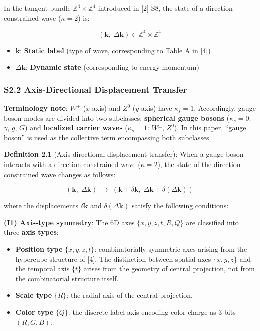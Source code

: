 \documentclass[
  a4paper,11pt]{article}
\providecommand{\tightlist}{%
  \setlength{\itemsep}{0pt}\setlength{\parskip}{0pt}}
\theoremstyle{definition}
\theoremstyle{remark}
\begin{document}
In the tangent bundle \(\mathbb{Z}^4 \times \mathbb{Z}^4\) introduced in
{[}2{]} S8, the state of a direction-constrained wave (\(\kappa = 2\))
is:

\[(\mathbf{k},\; \Delta\mathbf{k}) \in \mathbb{Z}^4 \times \mathbb{Z}^4\]

\begin{itemize}
\tightlist
\item
  \(\mathbf{k}\): \textbf{Static label} (type of wave, corresponding to
  Table A in {[}4{]})
\item
  \(\Delta\mathbf{k}\): \textbf{Dynamic state} (corresponding to
  energy-momentum)
\end{itemize}

\subsubsection{S2.2 Axis-Directional Displacement
Transfer}\label{s2.2-axis-directional-displacement-transfer}

\textbf{Terminology note}: \(W^{\pm}\) (\(x\)-axis) and \(Z^0\)
(\(y\)-axis) have \(\kappa_s = 1\). Accordingly, gauge boson modes are
divided into two subclasses: \textbf{spherical gauge bosons}
(\(\kappa_s = 0\): \(\gamma\), \(g\), \(G\)) and \textbf{localized
carrier waves} (\(\kappa_s = 1\): \(W^{\pm}\), \(Z^0\)). In this paper,
``gauge boson'' is used as the collective term encompassing both
subclasses.

\textbf{Definition 2.1} (Axis-directional displacement transfer): When a
gauge boson interacts with a direction-constrained wave
(\(\kappa = 2\)), the state of the direction-constrained wave changes as
follows:

\[(\mathbf{k},\; \Delta\mathbf{k}) \;\longrightarrow\; (\mathbf{k} + \delta\mathbf{k},\; \Delta\mathbf{k} + \delta(\Delta\mathbf{k}))\]

where the displacements \(\delta\mathbf{k}\) and
\(\delta(\Delta\mathbf{k})\) satisfy the following conditions:

\textbf{(I1) Axis-type symmetry}: The 6D axes \(\{x, y, z, t, R, Q\}\)
are classified into three \textbf{axis types}:

\begin{itemize}
\tightlist
\item
  \textbf{Position type} \(\{x, y, z, t\}\): combinatorially symmetric
  axes arising from the hypercube structure of {[}4{]}. The distinction
  between spatial axes \(\{x, y, z\}\) and the temporal axis \(\{t\}\)
  arises from the geometry of central projection, not from the
  combinatorial structure itself.
\item
  \textbf{Scale type} \(\{R\}\): the radial axis of the central
  projection.
\item
  \textbf{Color type} \(\{Q\}\): the discrete label axis encoding color
  charge as 3 bits \((R, G, B)\).
\end{itemize}
\end{document}
